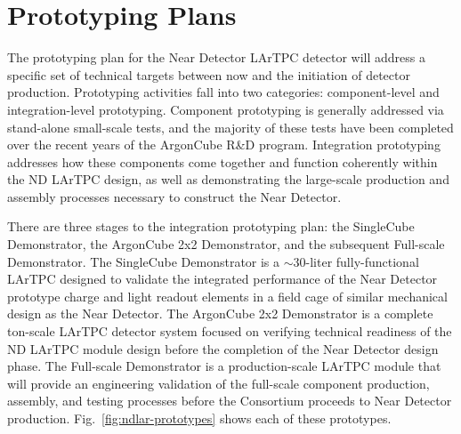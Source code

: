 \newpage

\section{Prototyping Plans}
\label{sec:lartpc-proto}

The prototyping plan for the Near Detector LArTPC detector will address a specific set of technical targets between now and the initiation of detector production.  
Prototyping activities fall into two categories: component-level and integration-level prototyping.  
Component prototyping is generally addressed via stand-alone small-scale tests, and the majority of these tests have been completed over the recent years of the ArgonCube R\&D program.
Integration prototyping addresses how these components come together and function coherently within the ND LArTPC design, as well as demonstrating the large-scale production and assembly processes necessary to construct the Near Detector.

There are three stages to the integration prototyping plan: the SingleCube Demonstrator, the ArgonCube 2x2 Demonstrator, and the subsequent Full-scale Demonstrator.
The SingleCube Demonstrator is a $\sim$30-liter fully-functional LArTPC designed to validate the integrated performance of the Near Detector prototype charge and light readout elements in a field cage of similar mechanical design as the Near Detector.
The ArgonCube 2x2 Demonstrator is a complete ton-scale LArTPC detector system focused on verifying technical readiness of the ND LArTPC module design before the completion of the Near Detector design phase.
The Full-scale Demonstrator is a production-scale LArTPC module that will provide an engineering validation of the full-scale component production, assembly, and testing processes before the Consortium proceeds to Near Detector production.
Fig.~\ref{fig:ndlar-prototypes} shows each of these prototypes.

